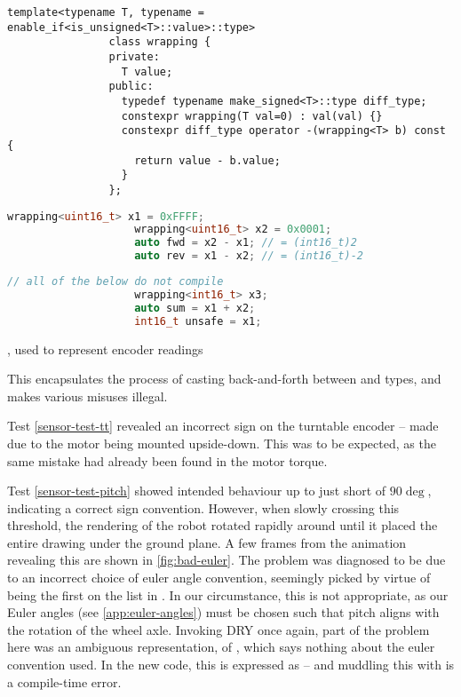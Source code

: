 \documentclass[main.tex]{subfiles}
\begin{document}
		\begin{listingfloat}
			\begin{lstlisting}[language={[11]c++},frame=single,gobble=8]
				template<typename T, typename = enable_if<is_unsigned<T>::value>::type>
				class wrapping {
				private:
				  T value;
				public:
				  typedef typename make_signed<T>::type diff_type;
				  constexpr wrapping(T val=0) : val(val) {}
				  constexpr diff_type operator -(wrapping<T> b) const {
				    return value - b.value;
				  }
				};
			\end{lstlisting}%
			\begin{minipage}[t]{0.5\linewidth-1em}
				\begin{lstlisting}[language=c++,frame=single,gobble=10]
					wrapping<uint16_t> x1 = 0xFFFF;
					wrapping<uint16_t> x2 = 0x0001;
					auto fwd = x2 - x1; // = (int16_t)2
					auto rev = x1 - x2; // = (int16_t)-2
				\end{lstlisting}
			\end{minipage}\hfill
			\begin{minipage}[t]{0.5\linewidth-1em}
				\begin{lstlisting}[language=c++,frame=single,gobble=10]
					// all of the below do not compile
					wrapping<int16_t> x3;
					auto sum = x1 + x2;
					int16_t unsafe = x1;
				\end{lstlisting}
			\end{minipage}\hfill
			\caption{, used to represent encoder readings}
			\label{listing:wrapping}
			\medskip
			\small
			This encapsulates the process of casting back-and-forth between  and  types, and makes various misuses illegal.
		\end{listingfloat}

		Test \ref{sensor-test-tt} revealed an incorrect sign on the turntable encoder -- made due to the motor being mounted upside-down.
		This was to be expected, as the same mistake had already been found in the motor torque.

		Test \ref{sensor-test-pitch} showed intended behaviour up to just short of $90\deg$, indicating a correct sign convention.
		However, when slowly crossing this threshold, the rendering of the robot rotated rapidly around until it placed the entire drawing under the ground plane.
		A few frames from the animation revealing this are shown in \cref{fig:bad-euler}.
		The problem was diagnosed to be due to an incorrect choice of euler angle convention, seemingly picked by virtue of being the first on the list in \cite{diebel2006representing}.
		In our circumstance, this is not appropriate, as our Euler angles (see \cref{app:euler-angles}) must be chosen such that pitch aligns with the rotation of the wheel axle.
		Invoking DRY once again, part of the problem here was an ambiguous representation, of , which says nothing about the euler convention used.
		In the new code, this is expressed as  -- and muddling this with  is a compile-time error.
\end{document}

